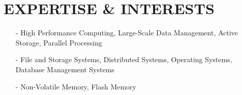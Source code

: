 \section{EXPERTISE \& INTERESTS}
\begin{itemize}[leftmargin=*]
\setlength\itemsep{-0.02in}
\item[-] High Performance Computing, Large-Scale Data Management,
Active Storage, Parallel Processing
\item[-] File and Storage Systems, Distributed Systems, Operating Systems,
Database Management Systems
\item[-] Non-Volatile Memory, Flash Memory
\end{itemize}

